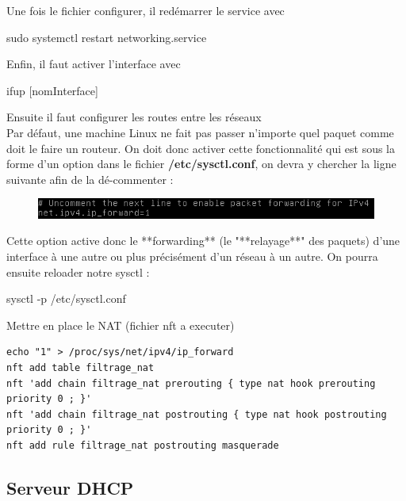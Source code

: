 \documentclass{article}
\begin{document}
Une fois le fichier configurer, il redémarrer le service avec 
\begin{command}
sudo systemctl restart networking.service
\end{command}
Enfin, il faut activer l’interface avec 
\begin{command}
    ifup [nomInterface]
\end{command}
Ensuite il faut configurer les routes entre les réseaux
\\

Par défaut, une machine Linux ne fait pas passer n'importe quel paquet comme doit le faire un routeur. On doit donc activer cette fonctionnalité qui est sous la forme d'un option dans le fichier \textbf{/etc/sysctl.conf}, on devra y chercher la ligne suivante afin de la dé-commenter :

\begin{figure}[h]
    \centering
    \includegraphics[width=1.2\textwidth]{../assets/image.png}
\end{figure}

Cette option active donc le **forwarding** (le "**relayage**" des paquets) d'une interface à une autre ou plus précisément d'un réseau à un autre. On pourra ensuite reloader notre sysctl :
\\

\begin{command}
    sysctl -p /etc/sysctl.conf
\end{command}

Mettre en place le NAT (fichier nft a executer) 
\begin{verbatim}
echo "1" > /proc/sys/net/ipv4/ip_forward
nft add table filtrage_nat
nft 'add chain filtrage_nat prerouting { type nat hook prerouting priority 0 ; }'
nft 'add chain filtrage_nat postrouting { type nat hook postrouting priority 0 ; }'
nft add rule filtrage_nat postrouting masquerade
\end{verbatim}

\subsection{Serveur DHCP}
\end{document}
